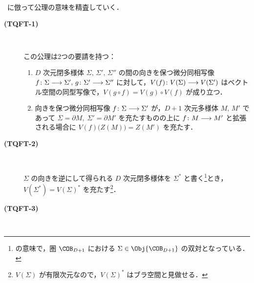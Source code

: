 \documentclass[TQFT_main]{subfiles}
\begin{document}
~\cite{Atiyah1988tqft}に倣って公理の意味を精査していく．
\begin{description}
    \item[\textbf{(TQFT-1)}]　
    
    この公理は2つの要請を持つ：
    \begin{enumerate}
        \item $D$ 次元閉多様体 $\Sigma,\, \Sigma',\, \Sigma''$ の間の向きを保つ微分同相写像 $f \colon \Sigma \longrightarrow \Sigma',\, g \colon \Sigma' \longrightarrow \Sigma''$  に対して，$V(f) \colon V(\Sigma) \longrightarrow V(\Sigma')$ はベクトル空間の同型写像で，$V(g \circ f) = V(g) \circ V(f)$ が成り立つ．
        \item 向きを保つ微分同相写像 $f \colon \Sigma \longrightarrow \Sigma'$ が，$D+1$ 次元多様体 $M,\, M'$ であって $\Sigma = \partial M,\; \Sigma' = \partial M'$ を充たすものの上に $f \colon M \longrightarrow M'$ と拡張される場合に $V(f) \bigl(Z(M)\bigr) = Z(M')$ を充たす．
    \end{enumerate}

    \item[\textbf{(TQFT-2)}]　
    
    $\Sigma$ の向きを逆にして得られる $D$ 次元閉多様体を $\Sigma^*$ と書く\footnote{の意味で，圏 $\COB_{D+1}$ における $\Sigma \in \Obj{\COB_{D+1}}$ の双対となっている．}とき，$V(\Sigma^*) = V(\Sigma)^*$ を充たす\footnote{$V(\Sigma)$ が有限次元なので，$V(\Sigma)^*$ はブラ空間と見做せる．}．

    \item[\textbf{(TQFT-3)}]　
    

\end{description}
\end{document}
